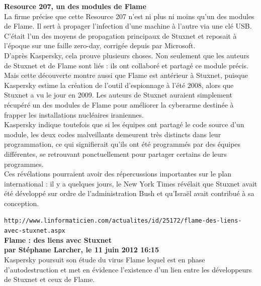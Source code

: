 \documentclass[11pt,twoside,a4paper]{article}
\begin{document}
\textbf{\large Resource 207, un des modules de Flame}~\\

La firme pr{\'e}cise que cette Resource 207 n'est ni plus ni moins qu'un des modules de Flame. Il sert {\`a} propager l'infection d'une machine {\`a} l'autre via une cl{\'e} USB. C'{\'e}tait l'un des moyens de propagation principaux de Stuxnet et reposait {\`a} l'{\'e}poque sur une faille zero-day, corrig{\'e}e depuis par Microsoft.~\\

D'apr{\`e}s Kaspersky, cela prouve plusieurs choses. Non seulement que les auteurs de Stuxnet et de Flame sont li{\'e}s : ils ont collabor{\'e} et partag{\'e} ce module pr{\'e}cis. Mais cette d{\'e}couverte montre aussi que Flame est ant{\'e}rieur {\`a} Stuxnet, puisque Kaspersky estime la cr{\'e}ation de l'outil d'espionnage {\`a} l'{\'e}t{\'e} 2008, alors que Stuxnet a vu le jour en 2009. Les auteurs de Stuxnet auraient simplement r{\'e}cup{\'e}r{\'e} un des modules de Flame pour am{\'e}liorer la cyberarme destin{\'e}e {\`a} frapper les installations nucl{\'e}aires iraniennes.~\\

Kaspersky indique toutefois que si les {\'e}quipes ont partag{\'e} le code source d'un module, les deux codes malveillants demeurent tr{\`e}s distincts dans leur programmation, ce qui signifierait qu'ils ont {\'e}t{\'e} programm{\'e}s par des {\'e}quipes diff{\'e}rentes, se retrouvant ponctuellement pour partager certains de leurs programmes.~\\

Ces r{\'e}v{\'e}lations pourraient avoir des r{\'e}percussions importantes sur le plan international : il y a quelques jours, le New York Times r{\'e}v{\'e}lait que Stuxnet avait {\'e}t{\'e} d{\'e}velopp{\'e} sur ordre de l'administration Bush et qu'Isra{\"e}l avait contribu{\'e} {\`a} sa conception.%

\clearpage

\texttt{http://www.linformaticien.com/actualites/id/25172/flame-des-liens-avec-stuxnet.aspx}~\\

\textbf{\LARGE Flame : des liens avec Stuxnet}~\\

\textbf{\small par St{\'e}phane Larcher, le 11 juin 2012 16:15}~\\

Kaspersky poursuit son {\'e}tude du virus Flame lequel est en phase d'autodestruction et met en {\'e}vidence l'existence d'un lien entre les d{\'e}veloppeurs de Stuxnet et ceux de Flame.~\\
\end{document}
